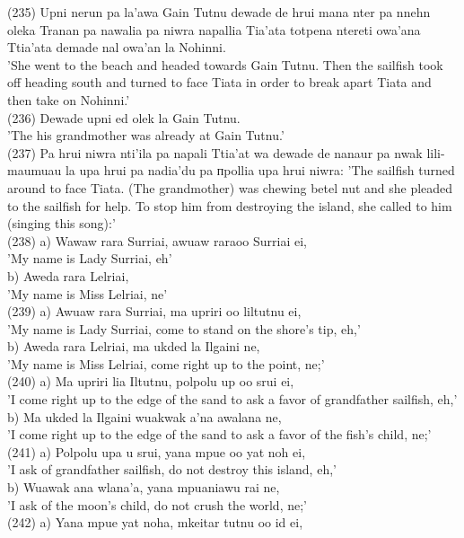 \documentclass[10pt]{article}
\begin{document}
(235) Upni nerun pa la'awa Gain Tutnu dewade de hrui mana nter pa nnehn oleka Tranan pa nawalia pa niwra napallia Tia'ata totpena ntereti owa'ana Ttia'ata demade nal owa'an la Nohinni.\\
'She went to the beach and headed towards Gain Tutnu. Then the sailfish took off heading south and turned to face Tiata in order to break apart Tiata and then take on Nohinni.'\\
(236) Dewade upni ed olek la Gain Tutnu.\\
'The his grandmother was already at Gain Tutnu.'\\
(237) Pa hrui niwra nti'ila pa napali Ttia'at wa dewade de nanaur pa nwak lili-maumuau la upa hrui pa nadia'du pa пpollia upa hrui niwra: 'The sailfish turned around to face Tiata. (The grandmother) was chewing betel nut and she pleaded to the sailfish for help. To stop him from destroying the island, she called to him (singing this song):'\\
(238) a) Wawaw rara Surriai, awuaw raraoo Surriai ei,\\
'My name is Lady Surriai, eh'\\
b) Aweda rara Lelriai,\\
'My name is Miss Lelriai, ne'\\
(239) a) Awuaw rara Surriai, ma upriri oo liltutnu ei,\\
'My name is Lady Surriai, come to stand on the shore's tip, eh,'\\
b) Aweda rara Lelriai, ma ukded la Ilgaini ne,\\
'My name is Miss Lelriai, come right up to the point, ne;'\\
(240) a) Ma upriri lia Iltutnu, polpolu up oo srui ei,\\
'I come right up to the edge of the sand to ask a favor of grandfather sailfish, eh,'\\
b) Ma ukded la Ilgaini wuakwak a'na awalana ne,\\
'I come right up to the edge of the sand to ask a favor of the fish's child, ne;'\\
(241) a) Polpolu upa u srui, yana mpue oo yat noh ei,\\
'I ask of grandfather sailfish, do not destroy this island, eh,'\\
b) Wuawak ana wlana'a, yana mpuaniawu rai ne,\\
'I ask of the moon's child, do not crush the world, ne;'\\
(242) a) Yana mpue yat noha, mkeitar tutnu oo id ei,\\
\end{document}
